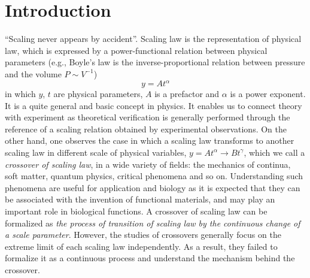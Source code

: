 \documentclass[default,iicol,10pt]{sn-jnl}%
\theoremstyle{thmstyleone}%
\theoremstyle{thmstyletwo}%
\theoremstyle{thmstylethree}%
\begin{document}
\section{Introduction}\label{sec1}

\textquotedblleft Scaling never appears by accident\textquotedblright \cite{Barenblatt2003}. Scaling law is the representation of physical law, which is expressed by a power-functional relation between physical parameters (e.g., Boyle's law is the inverse-proportional relation between pressure and the volume $P \sim V^{-1}$)
\begin{equation}
y  =  At^{\alpha}
\label{eq:E1a}
\end{equation} 
in which $y$, $t$ are physical parameters, $A$ is a prefactor and $\alpha$ is a power exponent. It is a quite general and basic concept in physics. It enables us to connect theory with experiment as theoretical verification is generally performed through the reference of a scaling relation obtained by experimental observations\cite{deGennes1979}. On the other hand, one observes the case in which a scaling law transforms to another scaling law in different scale of physical variables, $y=At^{\alpha} \to Bt^{\gamma}$, which we call a {\it crossover of scaling law}, in a wide variety of fields: the mechanics of continua\cite{Okumura2011,Murano2020}, soft matter\cite{Berry}, quantum physics\cite{Vasseur2013}, critical phenomena\cite{Lujiten1997,Lubeck2003} and so on. Understanding such phenomena are useful for application and biology as it is expected that they can be associated with the invention of functional materials\cite{Parnell2019,Raphael2021}, and may play an important role in biological functions\cite{Weizsacker1950, Bhushan, Krohs}. A crossover of scaling law can be formalized as {\it the process of transition of scaling law by the continuous change of a scale parameter}. However, the studies of crossovers generally focus on the extreme limit of each scaling law independently. As a result, they failed to formalize it as a continuous process and understand the mechanism behind the crossover.
\end{document}
